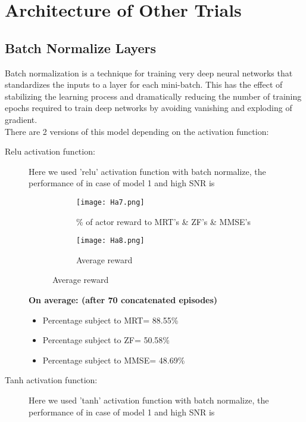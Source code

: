 \section{Architecture of Other Trials}
\subsection{Batch Normalize Layers}
Batch normalization is a technique for training very deep neural networks that standardizes the inputs to a layer for each mini-batch. This has the effect of stabilizing the learning process and dramatically reducing the number of training epochs required to train deep networks by avoiding vanishing and exploding of gradient. \\
There are 2 versions of this model depending on the activation function:
\begin{description}
    \item[Relu activation function:] Here we used 'relu' activation function with batch normalize, the performance of in case of model 1 and high SNR is 
    \begin{figure}[H]
        \centering
        \begin{subfigure}{.5\textwidth}
          \centering
          \texttt{[image: Ha7.png]}
          \caption{\% of actor reward to MRT's \& ZF's \& MMSE's}
          \label{fig:btl}
        \end{subfigure}%
        \begin{subfigure}{.5\textwidth}
          \centering
          \texttt{[image: Ha8.png]}
          \caption{Average reward}
          \label{fig:btl-1}
        \end{subfigure}
    \end{figure}
    \textbf{On average: (after 70 concatenated episodes)}
    \begin{itemize}
        \item Percentage subject to MRT= 88.55\% 
        \item Percentage subject to ZF= 50.58\% 
        \item Percentage subject to MMSE= 48.69\%
    \end{itemize}
    \item[Tanh activation function:] Here we used 'tanh' activation function with batch normalize, the performance of in case of model 1 and high SNR is 
    \begin{figure}[H]
        \centering
        \begin{subfigure}{.5\textwidth}

\end{subfigure}
\end{figure}
\end{description}
